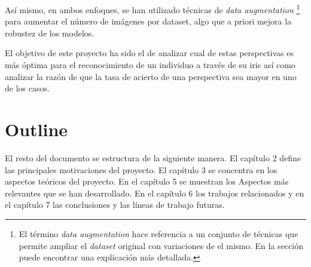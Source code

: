 
Así mismo, en ambos enfoques, se han utilizado técnicas de \textit{data augmentation} \footnote{El término \textit{data augmentation} hace referencia a un conjunto de técnicas que permite ampliar el \textit{dataset} original con variaciones de el mismo. En la sección  puede encontrar una explicación más detallada.} para aumentar el número de imágenes por dataset, algo que a priori mejora la robustez de los modelos.


El objetivo de este proyecto ha sido el de analizar cual de estas perspectivas es más óptima para el reconocimiento de un individuo a través de su iris así como analizar la razón de que la tasa de acierto de una perspectiva sea mayor en uno de los casos.

\section{Outline}

El resto del documento se estructura de la siguiente manera. El capítulo 2  define las principales motivaciones del proyecto. El capítulo 3  se concentra en los aspectos teóricos del proyecto. En el capítulo 5  se muestran los Aspectos
más relevantes que se han desarrollado. En el capítulo 6  los trabajos relacionados y en el capítulo 7  las conclusiones y las líneas de trabajo futuras.
